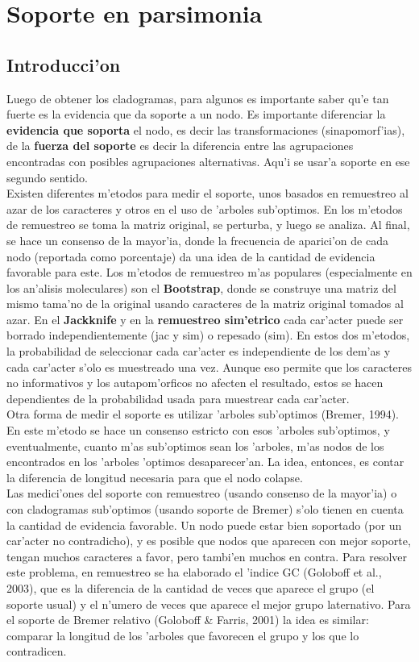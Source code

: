 \chapter{Soporte en parsimonia}
\section*{Introducci'on}
\label{ch:soporte.pars}
Luego de obtener los cladogramas, para algunos es importante saber qu'e tan fuerte es la evidencia que da soporte a un nodo. Es importante diferenciar la \textbf{evidencia que soporta} el nodo, es decir las transformaciones (sinapomorf'ias), de la \textbf{fuerza del soporte} es decir la diferencia entre las agrupaciones encontradas con posibles agrupaciones alternativas. Aqu'i se usar'a soporte en ese segundo sentido.\\
Existen diferentes m'etodos para medir el soporte, unos basados en remuestreo al azar de los caracteres y otros en el uso de 'arboles sub'optimos. En los m'etodos de remuestreo se toma la matriz original, se perturba, y luego se analiza. Al final, se hace un consenso de la mayor'ia, donde la frecuencia de aparici'on de cada nodo (reportada como porcentaje) da una idea de la cantidad de evidencia favorable para este. Los m'etodos de remuestreo m'as populares (especialmente en los an'alisis moleculares) son el \textbf{Bootstrap}, donde se construye una matriz del mismo tama'no de la original usando caracteres de la matriz original tomados al azar. En el \textbf{Jackknife} y en la \textbf{remuestreo sim'etrico} cada car'acter puede ser borrado independientemente (jac y sim) o repesado (sim). En estos dos m'etodos, la probabilidad de seleccionar cada car'acter es independiente de los dem'as y cada car'acter s'olo es muestreado una vez. Aunque eso permite que los caracteres no informativos y los autapom'orficos no afecten el resultado, estos se hacen dependientes de la probabilidad usada para muestrear cada car'acter.\\
Otra forma de medir el soporte es utilizar 'arboles sub'optimos (Bremer, 1994). En este m'etodo se hace un consenso estricto con esos 'arboles sub'optimos, y eventualmente, cuanto m'as sub'optimos sean los 'arboles, m'as nodos de los encontrados en los 'arboles 'optimos desaparecer'an. La idea, entonces, es contar la diferencia de longitud necesaria para que el nodo colapse.\\
Las medici'ones del soporte con remuestreo (usando consenso de la mayor'ia) o con cladogramas sub'optimos (usando soporte de Bremer) s'olo tienen en cuenta la cantidad de evidencia favorable. Un nodo puede estar bien soportado (por un car'acter no contradicho), y es posible que nodos que aparecen con mejor soporte, tengan muchos caracteres a favor, pero tambi'en muchos en contra. Para resolver este problema, en remuestreo se ha elaborado el 'indice GC (Goloboff et al., 2003), que es la diferencia de la cantidad de veces que aparece el grupo (el soporte usual) y el n'umero de veces que aparece el mejor grupo laternativo. Para el soporte de Bremer relativo (Goloboff \& Farris, 2001) la idea es similar: comparar la longitud de los 'arboles que favorecen el grupo y los que lo contradicen.\\

